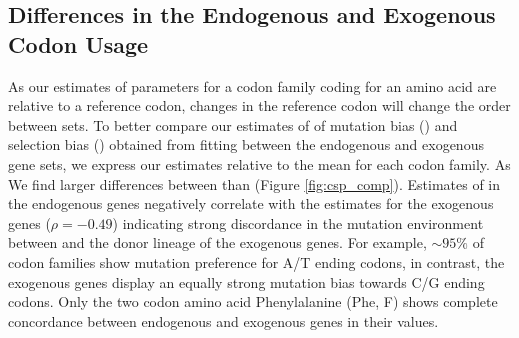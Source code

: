 \documentclass[12pt]{article}
\begin{document}
\subsection*{Differences in the Endogenous and Exogenous Codon Usage}

As our estimates of parameters for a codon family coding for an amino acid are relative to a reference codon, changes in the reference codon will change the order between sets.
To better compare our estimates of of mutation bias (\DM) and selection bias (\DE) obtained from fitting \ROC between the endogenous and exogenous gene sets, we express our estimates relative to the mean for each codon family.
As 
We find larger differences between \DM than \DE (Figure \ref{fig:csp_comp}). 
Estimates of \DM in the endogenous genes negatively correlate with the \DM estimates for the exogenous genes ($\rho = -0.49$) indicating strong discordance in the mutation environment between \kluyveri and the donor lineage of the exogenous genes.
For example, $\sim 95 \%$ of codon families show mutation preference for A/T ending codons, in contrast, the exogenous genes display an equally strong mutation bias towards C/G ending codons.
Only the two codon amino acid Phenylalanine (Phe, F) shows complete concordance between endogenous and exogenous genes in their \DM values.
\end{document}
